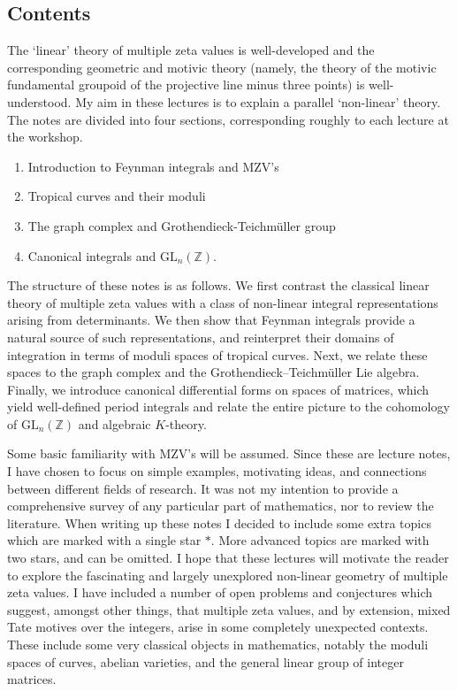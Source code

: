 \documentclass[12pt]{amsart}
\newcommand{\ZZ}{{\mathbb Z}}
\theoremstyle{plain}
\newcommand{\GL}{\mathrm{GL}}
\newcommand{\0}{\color{blue}{\mathsf{0}}}
\begin{document}
\subsection{Contents} 
The `linear' theory of multiple zeta values is well-developed and the corresponding geometric and motivic theory (namely, the theory of the motivic fundamental groupoid of the projective line minus three points) is well-understood. My aim in these lectures is to explain a parallel `non-linear' theory. 
The notes  are divided into four  sections,  corresponding roughly to each lecture at the workshop. 
\begin{enumerate} 
\item Introduction to Feynman integrals and MZV's 
\item Tropical curves and their moduli 
\item  The graph complex and Grothendieck-Teichm\"uller group 
\item  Canonical integrals and $\GL_n(\ZZ)$. 
\end{enumerate}
The structure of these notes is as follows. We first contrast the classical linear theory of multiple zeta values with a class of non-linear integral representations arising from determinants. We then show that Feynman integrals provide a natural source of such representations, and reinterpret their domains of integration in terms of moduli spaces of tropical curves. Next, we relate these spaces to the graph complex and the Grothendieck–Teichmüller Lie algebra. Finally, we introduce canonical differential forms on spaces of matrices, which yield well-defined period integrals and relate  the entire picture to the cohomology of $\mathrm{GL}_n(\mathbb{Z})$ and algebraic $K$-theory.


Some basic familiarity with MZV's will be assumed. 
Since these are lecture notes, I have chosen to focus on simple examples,  motivating ideas, and  connections between different fields of research. It was not my intention to provide  a comprehensive survey of any particular part of mathematics, nor to  review the  literature. 
When writing up these notes I decided to  include some extra topics which are marked with a single star $*$. More advanced topics are  marked with two stars, and can be omitted.
I hope that these lectures will motivate the reader to explore the fascinating and largely unexplored non-linear geometry of multiple zeta values.
I have included a  number of open problems and conjectures which suggest, amongst other things, that multiple zeta values, and by extension, mixed Tate motives over the integers,   arise in some completely unexpected contexts. These  include some very classical  objects in mathematics, notably  the moduli spaces of curves, abelian varieties, and the general linear group of integer matrices. 
\\
\end{document}
